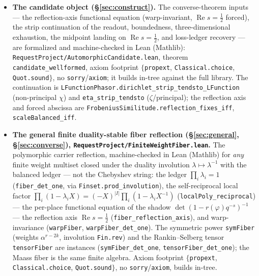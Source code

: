 \documentclass[11pt]{article}
\theoremstyle{definition}
\renewcommand{\Re}{\operatorname{Re}}
\begin{document}
\begin{itemize}
\item \textbf{The candidate object (\S\ref{sec:construct}).} The converse-theorem inputs --- the
reflection-axis functional equation (warp-invariant, $\Re s=\tfrac12$ forced), the strip continuation
of the readout, boundedness, three-dimensional exhaustion, the midpoint landing on $\Re s=\tfrac12$,
and loss-ledger recovery --- are formalized and machine-checked in Lean (Mathlib):
\texttt{RequestProject/AutomorphicCandidate.lean}, theorem \texttt{candidate\_wellformed}, axiom
footprint $\{$\texttt{propext}, \texttt{Classical.choice}, \texttt{Quot.sound}$\}$, no
\texttt{sorry}/\texttt{axiom}; it builds in-tree against the full library. The continuation is
\texttt{LFunctionPhasor.dirichlet\_strip\_tendsto\_LFunction} (non-principal $\chi$) and
\texttt{eta\_strip\_tendsto} ($\zeta$/principal); the reflection axis and forced abscissa are
\texttt{FrobeniusSimilitude.reflection\_fixes\_iff}, \texttt{scaleBalanced\_iff}.

\item \textbf{The general finite duality-stable fiber reflection (\S\ref{sec:general},
\S\ref{sec:converse}), \texttt{RequestProject/FiniteWeightFiber.lean}.} The polymorphic carrier
reflection, machine-checked in Lean (Mathlib) for \emph{any} finite weight multiset closed under the
duality involution $\lambda\mapsto\lambda^{-1}$ with the balanced ledger --- not the Chebyshev string:
the ledger $\prod_i\lambda_i=1$ (\texttt{fiber\_det\_one}, via \texttt{Finset.prod\_involution}), the
self-reciprocal local factor $\prod_i(1-\lambda_iX)=(-X)^{|I|}\prod_i(1-\lambda_iX^{-1})$
(\texttt{localPoly\_reciprocal}) --- the per-place functional equation of the shadow
$\det(1-r(\varphi)q^{-s})^{-1}$ --- the reflection axis $\Re s=\tfrac12$
(\texttt{fiber\_reflection\_axis}), and warp-invariance (\texttt{warpFiber}, \texttt{warpFiber\_det\_one}).
The symmetric power \texttt{symFiber} (weights $\alpha^{r-2k}$, involution \texttt{Fin.rev}) and the
Rankin--Selberg tensor \texttt{tensorFiber} are instances (\texttt{symFiber\_det\_one},
\texttt{tensorFiber\_det\_one}); the Maass fiber is the same finite algebra.  Axiom footprint
$\{$\texttt{propext}, \texttt{Classical.choice}, \texttt{Quot.sound}$\}$, no \texttt{sorry}/\texttt{axiom},
builds in-tree.


\end{itemize}
\end{document}
